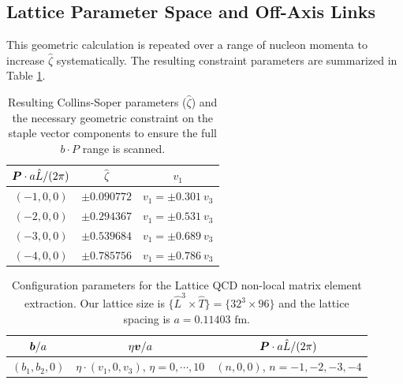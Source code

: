 \subsection{Lattice Parameter Space and Off-Axis Links}
\label{sec:lattice_parameter_space}
This geometric calculation is repeated over a range of nucleon momenta to increase $\hat{\zeta}$ systematically. The resulting constraint parameters are summarized in Table \ref{tab:zeta_directions}.

\begin{table}[h!]
    \centering
    \renewcommand{\arraystretch}{1.3}
    \begin{tabular}{|c|c|c|}
    \hline
        $\boldsymbol{P}\cdot a\hat{L}/(2\pi)$ & $\hat{\zeta}$ &  $v_{1}$\\
        \hline
        $(-1,0,0)$ & $\pm 0.090772$ &$v_{1}=\pm 0.301~v_{3}$\\
        \hline
        $(-2,0,0)$ & $\pm 0.294367$ &$v_{1}=\pm 0.531~v_{3}$\\
        \hline
        $(-3,0,0)$ & $\pm 0.539684$ &$v_{1}=\pm 0.689~v_{3}$\\
        \hline
        $(-4,0,0)$ & $\pm 0.785756$ &$v_{1}=\pm 0.786~v_{3}$\\
        \hline
    \end{tabular}
    \caption{Resulting Collins-Soper parameters ($\hat{\zeta}$) and the necessary geometric constraint on the staple vector components to ensure the full $b \cdot P$ range is scanned.}
    \label{tab:zeta_directions}
\end{table}

\begin{table}[h!]
    \centering
    \renewcommand{\arraystretch}{1.3}
    \begin{tabular}{|c|c|c|}
    \hline
       $\boldsymbol{b}/a$  &  $\eta \boldsymbol{v}/a$ & $\boldsymbol{P}\cdot a\hat{L}/(2\pi)$\\
       \hline
        $(b_{1},b_{2},0)$ & $ \eta\cdot(v_{1},0,v_{3})$, $\eta=0,\cdots,10$  & $(n,0,0)$, $n=-1,-2,-3,-4$\\
        \hline
    \end{tabular}
    \caption{Configuration parameters for the Lattice QCD non-local matrix element extraction. Our lattice size is $\{\hat{L}^3\times\hat{T}\}=\{32^3\times96\}$ and the lattice spacing is $a=0.11403\text{ fm}$.}
    \label{tab:lattice_params}
\end{table}

\pagebreak

